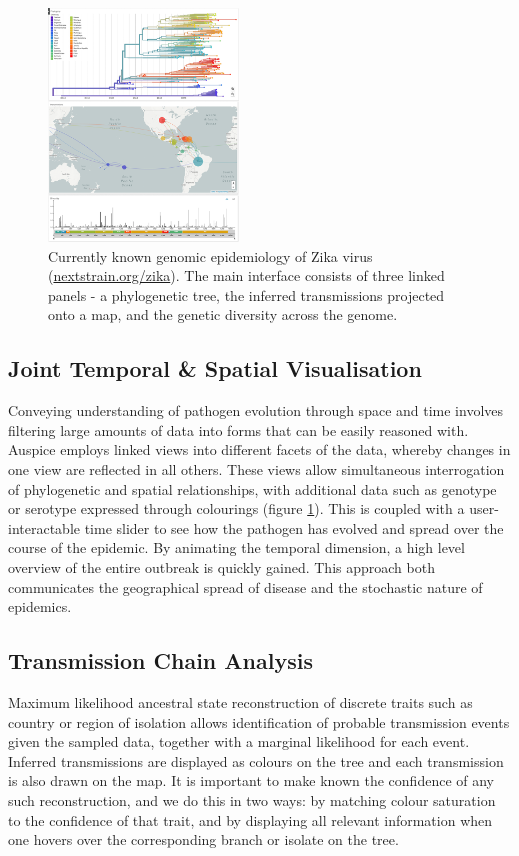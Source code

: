 \documentclass{bioinfo}
\begin{document}
\begin{figure}[!tpb]
\centerline{\includegraphics[width=0.45\textwidth]{figures/nextstrain}}
\caption{Currently known genomic epidemiology of Zika virus (\href{nextstrain.org/zika}{nextstrain.org/zika}). The main interface consists of three linked panels - a phylogenetic tree, the inferred transmissions projected onto a map, and the genetic diversity across the genome.}
\label{nextstrain}
\end{figure}

\subsection*{Joint Temporal \& Spatial Visualisation}
Conveying understanding of pathogen evolution through space and time involves filtering large amounts of data into forms that can be easily reasoned with.
Auspice employs linked views into different facets of the data, whereby changes in one view are reflected in all others.
These views allow simultaneous interrogation of phylogenetic and spatial relationships, with additional data such as genotype or serotype expressed through colourings (figure \ref{nextstrain}).
This is coupled with a user-interactable time slider to see how the pathogen has evolved and spread over the course of the epidemic.
By animating the temporal dimension, a high level overview of the entire outbreak is quickly gained.
This approach both communicates the geographical spread of disease and the stochastic nature of epidemics.


\subsection*{Transmission Chain Analysis}
Maximum likelihood ancestral state reconstruction of discrete traits such as country or region of isolation allows identification of probable transmission events given the sampled data, together with a marginal likelihood for each event.
Inferred transmissions are displayed as colours on the tree and each transmission is also drawn on the map.
It is important to make known the confidence of any such reconstruction, and we do this in two ways: by matching colour saturation to the confidence of that trait, and by displaying all relevant information when one hovers over the corresponding branch or isolate on the tree.
\end{document}
